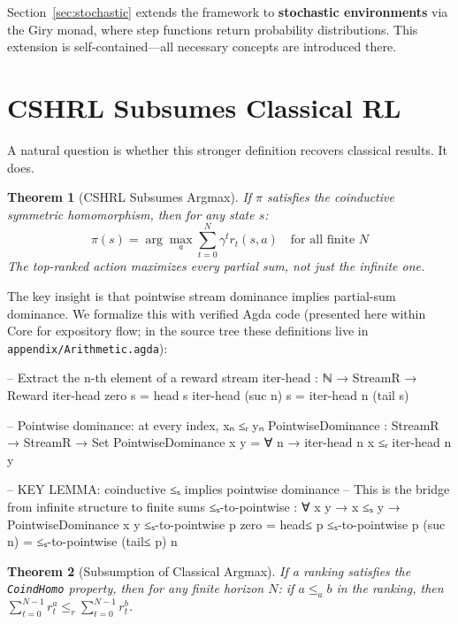 \documentclass[9pt,a4paper]{article}
\newcommand{\fpath}[1]{\nolinkurl{#1}}
\theoremstyle{plain}
\newtheorem{theorem}{Theorem}
\theoremstyle{definition}
\theoremstyle{remark}
\begin{document}
\noindent Section~\ref{sec:stochastic} extends the framework to \textbf{stochastic environments} via the Giry monad, where step functions return probability distributions. This extension is self-contained---all necessary concepts are introduced there.

\section{CSHRL Subsumes Classical RL}\label{sec:subsumes-classical}

A natural question is whether this stronger definition recovers classical results.  It does.

\begin{theorem}[CSHRL Subsumes Argmax]
If $\pi$ satisfies the coinductive symmetric homomorphism, then for any state $s$:
\[
\pi(s) = \arg\max_a \sum_{t=0}^{N} \gamma^t r_t(s,a) \quad \text{for all finite } N
\]
The top-ranked action maximizes \emph{every} partial sum, not just the infinite one.
\end{theorem}

The key insight is that pointwise stream dominance implies partial-sum dominance. We formalize this with verified Agda code (presented here within Core for expository flow; in the source tree these definitions live in \fpath{appendix/Arithmetic.agda}):

\begin{code}
  -- Extract the n-th element of a reward stream
  iter-head : ℕ → StreamR → Reward
  iter-head zero    s = head s
  iter-head (suc n) s = iter-head n (tail s)

  -- Pointwise dominance: at every index, xₙ ≤ᵣ yₙ
  PointwiseDominance : StreamR → StreamR → Set
  PointwiseDominance x y = ∀ n → iter-head n x ≤ᵣ iter-head n y

  -- KEY LEMMA: coinductive ≤ₛ implies pointwise dominance
  -- This is the bridge from infinite structure to finite sums
  ≤ₛ-to-pointwise : ∀ {x y} → x ≤ₛ y → PointwiseDominance x y
  ≤ₛ-to-pointwise p zero    = head≤ p
  ≤ₛ-to-pointwise p (suc n) = ≤ₛ-to-pointwise (tail≤ p) n
\end{code}

\begin{theorem}[Subsumption of Classical Argmax]
If a ranking satisfies the \texttt{CoindHomo} property, then for any finite horizon $N$: if $a \le_a b$ in the ranking, then $\sum_{t=0}^{N-1} r^a_t \le_r \sum_{t=0}^{N-1} r^b_t$.
\end{theorem}
\end{document}
